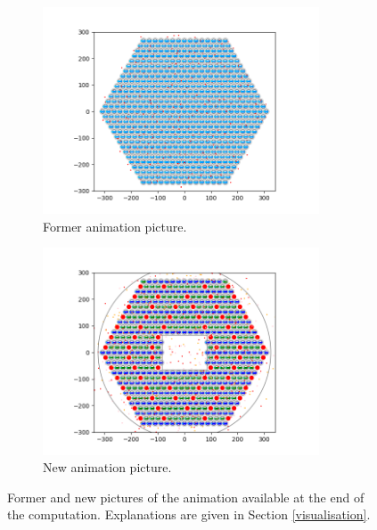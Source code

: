 \begin{figure}[h]
\begin{center}
	\begin{subfigure}{0.9\textwidth}
		\includegraphics[width=0.9\textwidth]{visualisation/former.png}
		\caption{Former animation picture.}
		\label{fig:visualisation:former}
	\end{subfigure}
	\begin{subfigure}{0.9\textwidth}
		\includegraphics[width=0.9\textwidth]{visualisation/new.png}
		\caption{New animation picture.}
		\label{fig:visualisation:new}
	\end{subfigure}
	\caption{Former and new pictures of the animation available at the end of the computation. Explanations are given in Section \ref{visualisation}.}
	\label{fig:visualisation}
\end{center}
\end{figure}